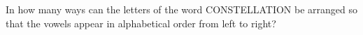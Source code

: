 In how many ways can the letters of the word CONSTELLATION be arranged so that the vowels appear in alphabetical order from left to right?
